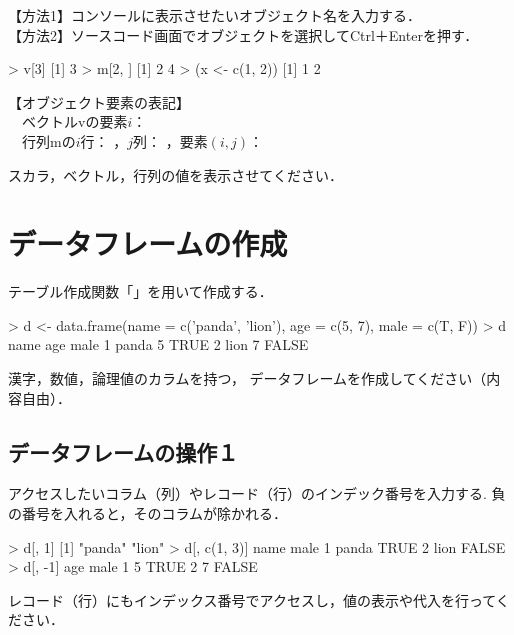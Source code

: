 \documentclass[../main]{subfiles}
\begin{document}
{
  【方法1】コンソールに表示させたいオブジェクト名を入力する．\\
  【方法2】ソースコード画面でオブジェクトを選択してCtrl＋Enterを押す．
}

\begin{ConsoleR}
> v[3]
[1] 3
> m[2, ]
[1] 2 4
> (x <- c(1, 2))
[1] 1 2
\end{ConsoleR}

【オブジェクト要素の\R 表記】\\
~~ベクトルvの要素$i$： \\
~~行列mの$i$行： ，$j$列： ，要素$(i, j)$： 

\begin{exercise}
  スカラ，ベクトル，行列の値を表示させてください．
  \tcblower
\end{exercise}

\section{データフレームの作成}

{
  テーブル作成関数「」を用いて作成する．
}

\begin{ConsoleR}
> d <- data.frame(name = c('panda', 'lion'),
                  age  = c(5, 7),
                  male = c(T, F))
> d
   name age  male
1 panda   5  TRUE
2  lion   7 FALSE
\end{ConsoleR}

\begin{exercise}
  漢字，数値，論理値のカラムを持つ，
  データフレームを作成してください（内容自由）．
  \tcblower
\end{exercise}

\subsection{データフレームの操作１}

{
  アクセスしたいコラム（列）やレコード（行）のインデック番号を入力する.
  負の番号を入れると，そのコラムが除かれる．
}

\begin{ConsoleR}
> d[, 1]
[1] "panda" "lion"
> d[, c(1, 3)]
   name  male
1 panda  TRUE
2  lion FALSE
> d[, -1]
  age  male
1   5  TRUE
2   7 FALSE
\end{ConsoleR}

\begin{exercise}
  レコード（行）にもインデックス番号でアクセスし，値の表示や代入を行ってください．
  \tcblower
\end{exercise}
\end{document}
